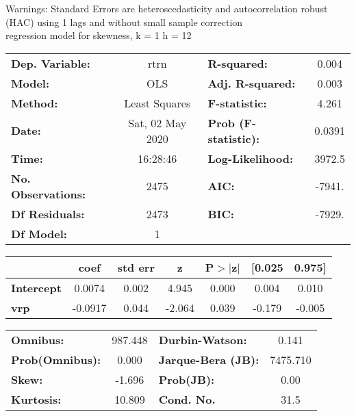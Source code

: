 Warnings: \newline
 [1] Standard Errors are heteroscedasticity and autocorrelation robust (HAC) using 1 lags and without small sample correction\\ 

regression model for skewness, k = 1 h = 12\begin{center}
\begin{tabular}{lclc}
\toprule
\textbf{Dep. Variable:}    &       rtrn       & \textbf{  R-squared:         } &     0.004   \\
\textbf{Model:}            &       OLS        & \textbf{  Adj. R-squared:    } &     0.003   \\
\textbf{Method:}           &  Least Squares   & \textbf{  F-statistic:       } &     4.261   \\
\textbf{Date:}             & Sat, 02 May 2020 & \textbf{  Prob (F-statistic):} &   0.0391    \\
\textbf{Time:}             &     16:28:46     & \textbf{  Log-Likelihood:    } &    3972.5   \\
\textbf{No. Observations:} &        2475      & \textbf{  AIC:               } &    -7941.   \\
\textbf{Df Residuals:}     &        2473      & \textbf{  BIC:               } &    -7929.   \\
\textbf{Df Model:}         &           1      & \textbf{                     } &             \\
\bottomrule
\end{tabular}
\begin{tabular}{lcccccc}
                   & \textbf{coef} & \textbf{std err} & \textbf{z} & \textbf{P$> |$z$|$} & \textbf{[0.025} & \textbf{0.975]}  \\
\midrule
\textbf{Intercept} &       0.0074  &        0.002     &     4.945  &         0.000        &        0.004    &        0.010     \\
\textbf{vrp}       &      -0.0917  &        0.044     &    -2.064  &         0.039        &       -0.179    &       -0.005     \\
\bottomrule
\end{tabular}
\begin{tabular}{lclc}
\textbf{Omnibus:}       & 987.448 & \textbf{  Durbin-Watson:     } &    0.141  \\
\textbf{Prob(Omnibus):} &   0.000 & \textbf{  Jarque-Bera (JB):  } & 7475.710  \\
\textbf{Skew:}          &  -1.696 & \textbf{  Prob(JB):          } &     0.00  \\
\textbf{Kurtosis:}      &  10.809 & \textbf{  Cond. No.          } &     31.5  \\
\bottomrule
\end{tabular}
\end{center}

